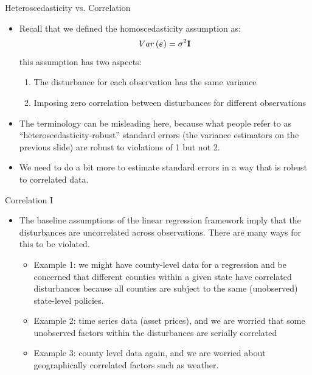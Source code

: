 \begin{frame}{Heteroscedasticity vs. Correlation}
\begin{itemize}
	\item Recall that we defined the homoscedasticity assumption as:\[
	Var\left(\boldsymbol{\varepsilon} \right) =\sigma^2 {\bf I}
	\]
	this assumption has two aspects:
	\begin{enumerate}
		\item The disturbance for each observation has the same variance
		\item Imposing zero correlation between disturbances for different observations
	\end{enumerate}

	\item The terminology can be misleading here, because what people refer to as ``heteroscedasticity-robust''
	standard errors (the variance estimators on the previous slide) are robust to violations of 1 but not 2. 

	\item We need to do a bit more to estimate standard errors in a way that is robust to correlated data. 

\end{itemize}
\end{frame}


\begin{frame}{Correlation I}
\begin{itemize}
	\item The baseline assumptions of the linear regression framework imply that
	the disturbances are uncorrelated across observations.  There are many ways for this to be violated. 
	\begin{itemize}
		\item Example 1: we might have county-level data for a regression and be concerned
		that different counties within a given state have correlated disturbances because
		all counties are subject to the same (unobserved) state-level policies.
		\item Example 2: time series data (asset prices), and we are worried that some unobserved
		factors within the disturbances are serially correlated
		\item Example 3: county level data again, and we are worried about geographically
		correlated factors such as weather. 
	\end{itemize}
\end{itemize}
\end{frame}


